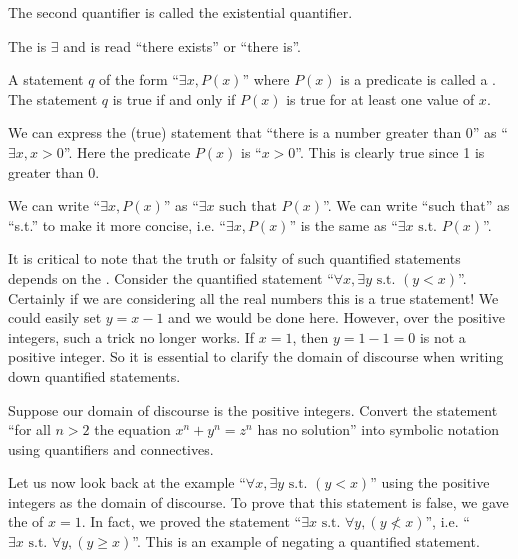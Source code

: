 The second quantifier is called the existential quantifier.

\begin{definition}
    The  is $\exists$ and is read ``there exists'' or ``there is''.

    A statement $q$ of the form ``$\exists x, P(x)$'' where $P(x)$ is a predicate is called a . The statement $q$ is true if and only if $P(x)$ is true for at least one value of $x$.
\end{definition}

\begin{example}
    We can express the (true) statement that ``there is a number greater than 0'' as ``$\exists x, x > 0$''. Here the predicate $P(x)$ is ``$x > 0$''. This is clearly true since 1 is greater than 0.
\end{example}

\begin{remark}
    We can write ``$\exists x, P(x)$'' as ``$\exists x \text{ such that } P(x)$''. We can write ``such that'' as ``s.t.'' to make it more concise, i.e. ``$\exists x, P(x)$'' is the same as ``$\exists x \text{ s.t. } P(x)$''.
\end{remark}

It is critical to note that the truth or falsity of such quantified statements depends on the . Consider the quantified statement ``$\forall x, \exists y \text{ s.t. } (y<x)$''. Certainly if we are considering all the real numbers this is a true statement! We could easily set $y = x - 1$ and we would be done here. However, over the positive integers, such a trick no longer works. If $x = 1$, then $y = 1 - 1 = 0$ is not a positive integer. So it is essential to clarify the domain of discourse when writing down quantified statements.

\begin{exercise}
    Suppose our domain of discourse is the positive integers. Convert the statement ``for all $n > 2$ the equation $x^n + y^n = z^n$ has no solution'' into symbolic notation using quantifiers and connectives.
\end{exercise}

Let us now look back at the example ``$\forall x, \exists y \text{ s.t. } (y<x)$'' using the positive integers as the domain of discourse. To prove that this statement is false, we gave the  of $x = 1$. In fact, we proved the statement ``$\exists x \text{ s.t. } \forall y, (y \not< x)$'', i.e. ``$\exists x \text{ s.t. } \forall y, (y \geq x)$''. This is an example of negating a quantified statement.

